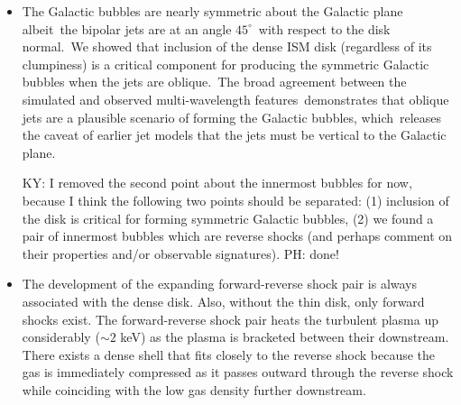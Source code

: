 \documentclass[fleqn,usenatbib,useAMS]{mnras}
\begin{document}
\begin{itemize}

\item The Galactic bubbles are nearly symmetric about the Galactic plane albeit\
      the bipolar jets are at an angle $45^{\circ}$\
      with respect to the disk normal.\
      We showed that inclusion of the dense ISM disk (regardless of its clumpiness) is a critical component for producing the symmetric Galactic bubbles when the jets are oblique.\
      The broad agreement between the simulated and observed multi-wavelength features\
      demonstrates that oblique jets are a plausible scenario of forming the Galactic bubbles, which\
      releases the caveat of earlier jet models that the jets must be vertical to the Galactic plane.\


      {\color{red} KY: I removed the second point about the innermost bubbles for now, because I think the following two points should be separated: (1) inclusion of the disk is critical for forming symmetric Galactic bubbles, (2) we found a pair of innermost bubbles which are reverse shocks (and perhaps comment on their properties and/or observable signatures). PH: done! }
\item The development of the expanding forward-reverse shock pair is always associated with the dense disk. Also, without the thin disk, only forward shocks exist. The forward-reverse shock pair heats the turbulent plasma up considerably ($\sim2$ keV) as the plasma is bracketed between their downstream. There exists a dense shell that fits closely to the reverse shock because the gas is immediately compressed as it passes outward through the reverse shock while coinciding with the low gas density further downstream.


\end{itemize}
\end{document}
